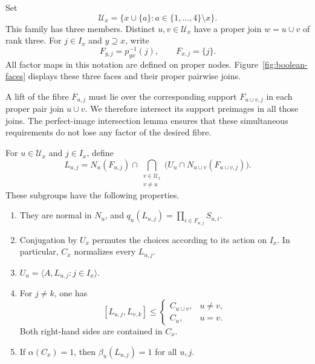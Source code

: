 Set
\[
 \mathcal U_x=\{x\cup\{a\}:a\in\{1,\ldots,4\}\setminus x\}.
\]
This family has three members.  Distinct $u,v\in\mathcal U_x$ have a
proper join $w=u\cup v$ of rank three.  For $j\in I_x$ and
$y\supseteq x$, write
\[
                   F_{y,j}=p_{yx}^{-1}(j),
       \qquad F_{x,j}=\{j\}.
\]
All factor maps in this notation are defined on proper nodes.
Figure~\ref{fig:boolean-faces} displays these three faces and their
proper pairwise joins.

A lift of the fibre $F_{u,j}$ must lie over the corresponding support
$F_{u\cup v,j}$ in each proper pair join $u\cup v$.  We therefore intersect its support
preimages in all those joins.  The perfect-image intersection lemma
ensures that these simultaneous requirements do not lose any factor
of the desired fibre.

\begin{lemma}
\label{glue:lifts}
For $u\in\mathcal U_x$ and $j\in I_x$, define
\begin{equation}\label{glue:Luj}
 L_{u,j}=N_u(F_{u,j})\cap
       \bigcap_{\substack{v\in\mathcal U_x\\v\ne u}}
       \bigl(U_u\cap N_{u\cup v}(F_{u\cup v,j})\bigr).
\end{equation}
These subgroups have the following properties.
\begin{enumerate}[label=\textup{(\roman*)}]
\item They are normal in $N_u$, and
$q_u(L_{u,j})=\prod_{i\in F_{u,j}}S_{u,i}$.
\item Conjugation by $U_x$ permutes the choices according to its action
on $I_x$.  In particular, $C_x$ normalizes every $L_{u,j}$.
\item $U_u=\langle A,L_{u,j}:j\in I_x\rangle$.
\item For $j\ne k$, one has
\[
 [L_{u,j},L_{v,k}]\le
 \begin{cases}
 C_{u\cup v},&u\ne v,\\
 C_u,&u=v.
 \end{cases}
\]
Both right-hand sides are contained in $C_x$.
\item If $\alpha(C_x)=1$, then $\beta_u(L_{u,j})=1$ for all $u,j$.
\end{enumerate}
\end{lemma}

